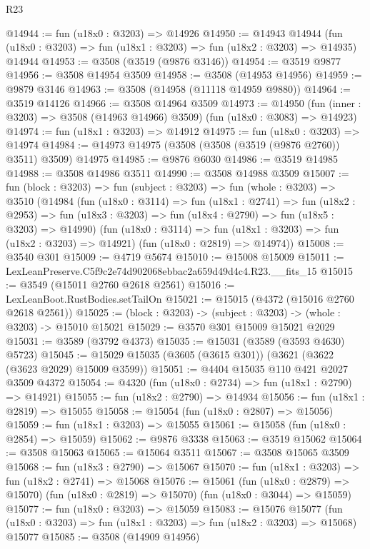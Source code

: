 \begin{lexlean}{R23}
\begin{coremodule}
@14944 := fun (u18x0 : @3203) => @14926
@14950 := @14943
    @14944
    (fun (u18x0 : @3203) => fun (u18x1 : @3203) => fun (u18x2 : @3203) => @14935)
    @14944
@14953 := @3508 (@3519 (@9876 @3146))
@14954 := @3519 @9877
@14956 := @3508 @14954 @3509
@14958 := @3508 (@14953 @14956)
@14959 := @9879 @3146
@14963 := @3508 (@14958 (@11118 @14959 @9880))
@14964 := @3519 @14126
@14966 := @3508 @14964 @3509
@14973 := @14950
    (fun (inner : @3203) => @3508 (@14963 @14966) @3509)
    (fun (u18x0 : @3083) => @14923)
@14974 := fun (u18x1 : @3203) => @14912
@14975 := fun (u18x0 : @3203) => @14974
@14984 := @14973 @14975 (@3508 (@3508 (@3519 (@9876 @2760)) @3511) @3509) @14975
@14985 := @9876 @6030
@14986 := @3519 @14985
@14988 := @3508 @14986 @3511
@14990 := @3508 @14988 @3509
@15007 := fun (block : @3203) =>
  fun (subject : @3203) =>
  fun (whole : @3203) =>
  @3510
    (@14984
      (fun (u18x0 : @3114) =>
      fun (u18x1 : @2741) =>
      fun (u18x2 : @2953) =>
      fun (u18x3 : @3203) => fun (u18x4 : @2790) => fun (u18x5 : @3203) => @14990)
      (fun (u18x0 : @3114) => fun (u18x1 : @3203) => fun (u18x2 : @3203) => @14921)
      (fun (u18x0 : @2819) => @14974))
@15008 := @3540 @301
@15009 := @4719 @5674
@15010 := @15008 @15009
@15011 := LexLeanPreserve.C5f9c2e74d902068ebbac2a659d49d4c4.R23.__fits_15
@15015 := @3549 (@15011 @2760 @2618 @2561)
@15016 := LexLeanBoot.RustBodies.setTailOn
@15021 := @15015 (@4372 (@15016 @2760 @2618 @2561))
@15025 := (block : @3203) -> (subject : @3203) -> (whole : @3203) -> @15010 @15021
@15029 := @3570 @301 @15009 @15021 @2029
@15031 := @3589 (@3792 @4373)
@15035 := @15031 (@3589 (@3593 @4630) @5723)
@15045 := @15029 @15035 (@3605 (@3615 @301)) (@3621 (@3622 (@3623 @2029) @15009 @3599))
@15051 := @4404 @15035 @110 @421 @2027 @3509 @4372
@15054 := @4320 (fun (u18x0 : @2734) => fun (u18x1 : @2790) => @14921)
@15055 := fun (u18x2 : @2790) => @14934
@15056 := fun (u18x1 : @2819) => @15055
@15058 := @15054 (fun (u18x0 : @2807) => @15056)
@15059 := fun (u18x1 : @3203) => @15055
@15061 := @15058 (fun (u18x0 : @2854) => @15059)
@15062 := @9876 @3338
@15063 := @3519 @15062
@15064 := @3508 @15063
@15065 := @15064 @3511
@15067 := @3508 @15065 @3509
@15068 := fun (u18x3 : @2790) => @15067
@15070 := fun (u18x1 : @3203) => fun (u18x2 : @2741) => @15068
@15076 := @15061
    (fun (u18x0 : @2879) => @15070)
    (fun (u18x0 : @2819) => @15070)
    (fun (u18x0 : @3044) => @15059)
@15077 := fun (u18x0 : @3203) => @15059
@15083 := @15076
    @15077
    (fun (u18x0 : @3203) => fun (u18x1 : @3203) => fun (u18x2 : @3203) => @15068)
    @15077
@15085 := @3508 (@14909 @14956)

\end{coremodule}
\end{lexlean}
